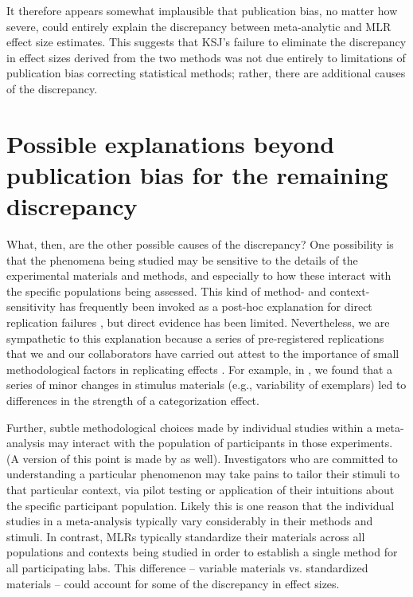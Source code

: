 \documentclass[man,floatsintext]{apa7}
\begin{document}
It therefore appears somewhat implausible that publication bias, no matter how severe, could entirely explain the discrepancy between meta-analytic and MLR effect size estimates. This suggests that KSJ's failure to eliminate the discrepancy in effect sizes derived from the two methods was not due entirely to limitations of publication bias correcting statistical methods; rather, there are additional causes of the discrepancy.  

\section{Possible explanations beyond publication bias for the remaining discrepancy}

What, then, are the other possible causes of the discrepancy? One possibility is that the phenomena being studied may be sensitive to the details of the experimental materials and methods, and especially to how these interact with the specific populations being assessed. This kind of method- and context-sensitivity has frequently been invoked as a post-hoc explanation for direct replication failures \parencite{van2016contextual}, but direct evidence has been limited. Nevertheless, we are sympathetic to this explanation because a series of pre-registered replications that we and our collaborators have carried out attest to the importance of small methodological factors in replicating effects \parencite{lewis2018still,lewis2016understanding,phillips2015second}. For example, in \cite{lewis2016understanding}, we found that a series of minor changes in stimulus materials (e.g., variability of exemplars) led to differences in the strength of a categorization effect. 


Further, subtle methodological choices made by individual studies within a meta-analysis may interact with the population of participants in those experiments. (A version of this point is made by \cite{yarkoni2020} as well). Investigators who are committed to understanding a particular phenomenon may take pains to tailor their stimuli to that particular context, via pilot testing or application of their intuitions about the specific participant population. Likely this is one reason that the individual studies in a meta-analysis typically vary considerably in their methods and stimuli. In contrast, MLRs typically standardize their materials across all populations and contexts being studied in order to establish a single method for all participating labs. This difference -- variable materials vs. standardized materials -- could account for some of the discrepancy in effect sizes. 
\end{document}
